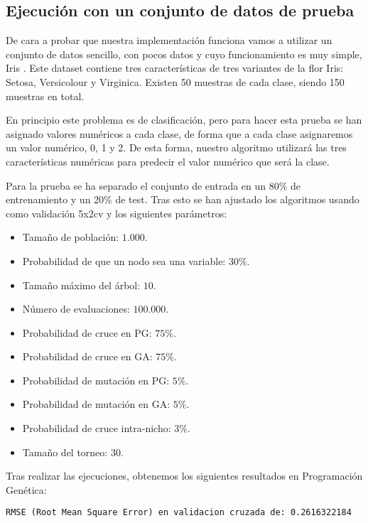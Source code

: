 \newpage

\subsection{Ejecución con un conjunto de datos de prueba}

De cara a probar que nuestra implementación funciona vamos a utilizar un conjunto de datos sencillo, con pocos datos y cuyo funcionamiento es muy simple, Iris \cite{irisDataset}. Este dataset contiene tres características de tres variantes de la flor Iris: Setosa, Versicolour y Virginica. Existen 50 muestras de cada clase, siendo 150 muestras en total.

En principio este problema es de clasificación, pero para hacer esta prueba se han asignado valores numéricos a cada clase, de forma que a cada clase asignaremos un valor numérico, 0, 1 y 2. De esta forma, nuestro algoritmo utilizará las tres características numéricas para predecir el valor numérico que será la clase.


Para la prueba se ha separado el conjunto de entrada en un 80\% de entrenamiento y un 20\% de test. Tras esto se han ajustado los algoritmos usando como validación 5x2cv y los siguientes parámetros:

\begin{itemize}
	\item Tamaño de población: $1.000$.
	\item Probabilidad de que un nodo sea una variable: $30\%$.
	\item Tamaño máximo del árbol: $10$.
	\item Número de evaluaciones: $100.000$.
	\item Probabilidad de cruce en PG: $75\%$.
	\item Probabilidad de cruce en GA: $75\%$.
	\item Probabilidad de mutación en PG: $5\%$.
	\item Probabilidad de mutación en GA: $5\%$.
	\item Probabilidad de cruce intra-nicho: $3\%$.
	\item Tamaño del torneo: $30$.
\end{itemize}

Tras realizar las ejecuciones, obtenemos los siguientes resultados en Programación Genética:

\begin{lstlisting}
RMSE (Root Mean Square Error) en validacion cruzada de: 0.2616322184
\end{lstlisting}


